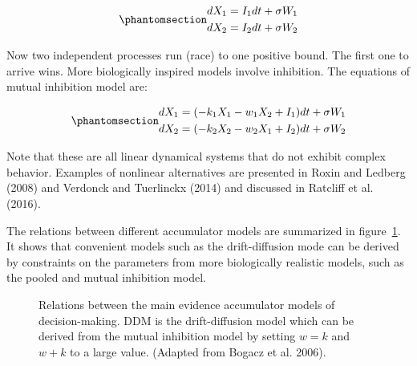\documentclass[
  a4paper,
  DIV=11,
  numbers=noendperiod,
  oneside]{scrreprt}
\begin{document}
\begin{equation}\phantomsection\label{eq-ch4n-8-old-28}{
\begin{gathered}
dX_{1} = I_{1}dt + \sigma W_{1} \\
dX_{2} = I_{2}dt + \sigma W_{2} 
\end{gathered}
}\end{equation}

Now two independent processes run (race) to one positive bound. The
first one to arrive wins. More biologically inspired models involve
inhibition. The equations of mutual inhibition model are:

\begin{equation}\phantomsection\label{eq-ch4n-9-old-29}{
\begin{gathered}
dX_{1} = (-k_{1}X_{1} - w_{1}X_{2} + I_{1})dt + \sigma W_{1} \\
dX_{2} = (-k_{2}X_{2} - w_{2}X_{1} + I_{2})dt + \sigma W_{2}
\end{gathered}
}\end{equation}

Note that these are all linear dynamical systems that do not exhibit
complex behavior. Examples of nonlinear alternatives are presented in
Roxin and Ledberg (2008) and Verdonck and Tuerlinckx (2014) and
discussed in Ratcliff et al. (2016).

The relations between different accumulator models are summarized in
figure~\ref{fig-ch4n-img8-old-56}. It shows that convenient models such
as the drift-diffusion mode can be derived by constraints on the
parameters from more biologically realistic models, such as the pooled
and mutual inhibition model.

\begin{figure}


\caption{\label{fig-ch4n-img8-old-56}Relations between the main evidence
accumulator models of decision-making. DDM is the drift-diffusion model
which can be derived from the mutual inhibition model by setting
\(w = k\) and \(w + k\) to a large value. (Adapted from Bogacz et al.
2006).}

\end{figure}%
\end{document}
